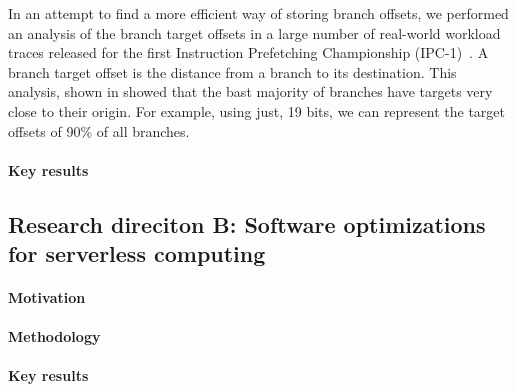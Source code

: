 \documentclass[../main.tex]{subfiles}
\begin{document}
\begin{refsection}
In an attempt to find a more efficient way of storing branch offsets, we performed an analysis of the branch target offsets in a large number of real-world workload traces released for the first Instruction Prefetching Championship (IPC-1)~\cite{ipc1}. A branch target offset is the distance from a branch to its destination. This analysis, shown in  showed that the bast majority of branches have targets very close to their origin. For example, using just, 19 bits, we can represent the target offsets of 90\% of all branches.


\paragraph{Key results}


\subsection{Research direciton B: Software optimizations for serverless computing}

\paragraph{Motivation}



\paragraph{Methodology}

\paragraph{Key results}



\ifx\chapincluded\undefined
  \printbibliography
  \end{refsection}
 \fi
\end{document}
